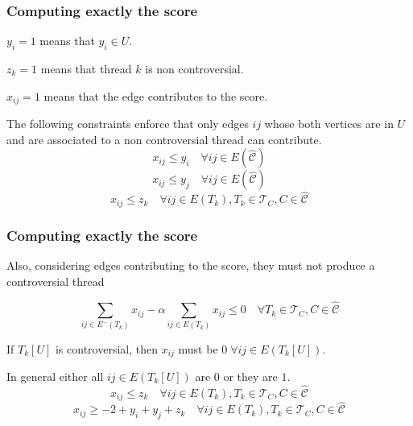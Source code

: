 \documentclass{beamer}
\begin{document}
\begin{frame}[c]
	\frametitle{Computing exactly the score}
	$y_i = 1$ means that $y_i \in U$.

	$z_k = 1$ means that thread $k$ is non controversial.

	$x_{ij} = 1$ means that the edge contributes to the score.

	\bigskip

	The following constraints enforce that only edges $ij$ whose both vertices
	are in $U$ and are associated to a non controversial thread can contribute.
	\begin{equation*}
		x _{ij} \leq y_i \quad \forall ij \in E(\hat{\mathcal{C}})
	\end{equation*}
	\begin{equation*}
		x _{ij} \leq y_j \quad \forall ij \in E(\hat{\mathcal{C}})
	\end{equation*}
	\begin{equation*}
		x _{ij} \leq z_k \quad \forall ij \in E(T_k), T_k \in \mathcal{T} _{C}, C \in \hat{\mathcal{C} }
	\end{equation*}

\end{frame}

\begin{frame}[c]
	\frametitle{Computing exactly the score}
	Also, considering edges contributing to the score, they must not produce a
	controversial thread

	\begin{equation*}
		\sum^{}_{ij \in E^{-} (T_k)} x_{ij} - \alpha \sum^{}_{ij \in E(T_k)}
		x_{ij} \leq 0 \quad \forall T_{k} \in \mathcal{T} _{C}, C \in
		\hat{\mathcal{C}}
	\end{equation*}

	If $T_{k} [U]$ is controversial, then $x_{ij} $ must be $0 \; \forall ij \in
		E(T_{k}[U] )$.

	\bigskip

	In general either all $ij \in
		E(T_{k}[U] )$ are $0$ or they are $1$.
	\begin{equation*}
		x _{ij} \leq z_k \quad \forall ij \in E(T_k), T_k \in \mathcal{T} _{C}, C \in \hat{\mathcal{C} }
	\end{equation*}
	\begin{equation*}
		x _{ij} \geq - 2 + y_i + y_j + z_k \quad \forall ij \in E(T_k), T_k \in \mathcal{T} _{C}, C \in \hat{\mathcal{C} }
	\end{equation*}
\end{frame}
\end{document}
